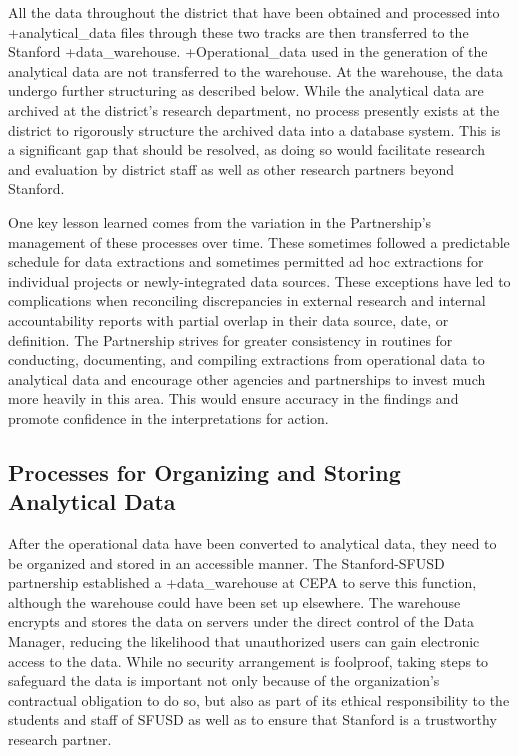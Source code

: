 \documentclass[
]{book}
\begin{document}
All the data throughout the district that have been obtained and processed into +analytical\_data\textbar{} files through these two tracks are then transferred to the Stanford +data\_warehouse\textbar. +Operational\_data\textbar{} used in the generation of the analytical data are not transferred to the warehouse. At the warehouse, the data undergo further structuring as described below. While the analytical data are archived at the district's research department, no process presently exists at the district to rigorously structure the archived data into a database system. This is a significant gap that should be resolved, as doing so would facilitate research and evaluation by district staff as well as other research partners beyond Stanford.

One key lesson learned comes from the variation in the Partnership's management of these processes over time. These sometimes followed a predictable schedule for data extractions and sometimes permitted ad hoc extractions for individual projects or newly-integrated data sources. These exceptions have led to complications when reconciling discrepancies in external research and internal accountability reports with partial overlap in their data source, date, or definition. The Partnership strives for greater consistency in routines for conducting, documenting, and compiling extractions from operational data to analytical data and encourage other agencies and partnerships to invest much more heavily in this area. This would ensure accuracy in the findings and promote confidence in the interpretations for action.

\hypertarget{processes-for-organizing-and-storing-analytical-data}{%
\subsection{Processes for Organizing and Storing Analytical Data}\label{processes-for-organizing-and-storing-analytical-data}}

After the operational data have been converted to analytical data, they need to be organized and stored in an accessible manner. The Stanford-SFUSD partnership established a +data\_warehouse\textbar{} at CEPA to serve this function, although the warehouse could have been set up elsewhere. The warehouse encrypts and stores the data on servers under the direct control of the Data Manager, reducing the likelihood that unauthorized users can gain electronic access to the data. While no security arrangement is foolproof, taking steps to safeguard the data is important not only because of the organization's contractual obligation to do so, but also as part of its ethical responsibility to the students and staff of SFUSD as well as to ensure that Stanford is a trustworthy research partner.
\end{document}
